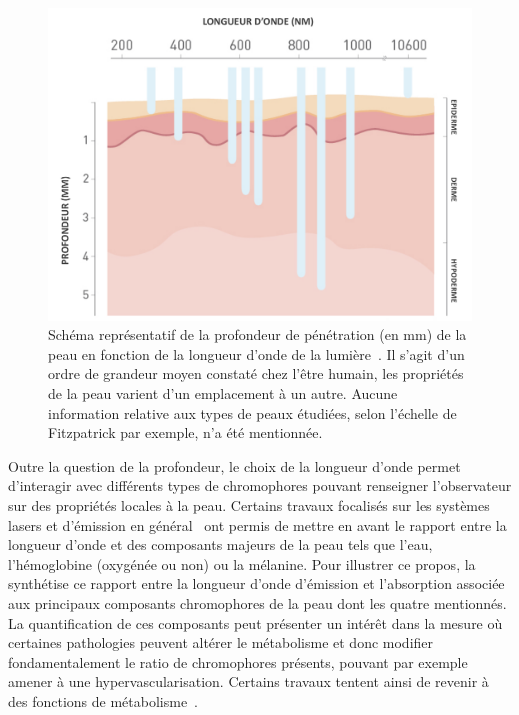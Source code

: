 \begin{figure}[H]
    \centering
    \includegraphics[width=0.9\linewidth]{contents/chapter_2/resources/scheme_light_penatrating.pdf}
    \caption{Schéma représentatif de la profondeur de pénétration (en mm) de la peau en fonction de la longueur d’onde de la lumière~\cite{Barolet2008}. Il s'agit d'un ordre de grandeur moyen constaté chez l'être humain, les propriétés de la peau varient d'un emplacement à un autre. Aucune information relative aux types de peaux étudiées, selon l'échelle de Fitzpatrick par exemple, n'a été mentionnée.}
    \label{fig:scheme_light_penatrating}
\end{figure}\par

Outre la question de la profondeur, le choix de la longueur d'onde permet d'interagir avec différents types de chromophores pouvant renseigner l'observateur sur des propriétés locales à la peau. Certains travaux focalisés sur les systèmes lasers et d'émission en général~\cite{Stewart2013} ont permis de mettre en avant le rapport entre la longueur d'onde et des composants majeurs de la peau tels que l'eau, l'hémoglobine (oxygénée ou non) ou la mélanine. Pour illustrer ce propos, la  synthétise ce rapport entre la longueur d'onde d'émission et l'absorption associée aux principaux composants chromophores de la peau dont les quatre mentionnés. La quantification de ces composants peut présenter un intérêt dans la mesure où certaines pathologies peuvent altérer le métabolisme et donc modifier fondamentalement le ratio de chromophores présents, pouvant par exemple amener à une hypervascularisation. Certains travaux tentent ainsi de revenir à des fonctions de métabolisme~\cite{Im2016}.\par

